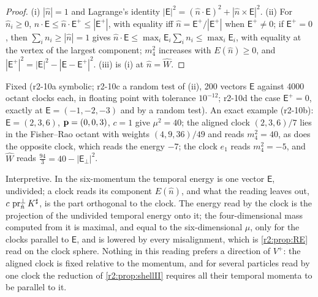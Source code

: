 \begin{proof}
(i) $|\hat n|=1$ and Lagrange's identity $|\boldsymbol{\mathsf E}|^2=(\hat n\cdot\boldsymbol{\mathsf E})^2+|\hat n\times\boldsymbol{\mathsf E}|^2$. (ii) For $\hat n_i\ge0$,
$\hat n\cdot\boldsymbol{\mathsf E}\le \hat n\cdot\boldsymbol{\mathsf E}^+\le|\boldsymbol{\mathsf E}^+|$, with equality iff $\hat n=\boldsymbol{\mathsf E}^+/|\boldsymbol{\mathsf E}^+|$
when $\boldsymbol{\mathsf E}^+\neq0$; if $\boldsymbol{\mathsf E}^+=0$, then $\sum_in_i\ge|\hat n|=1$ gives $\hat n\cdot\boldsymbol{\mathsf E}\le\max_i\mathsf E_i\sum_in_i\le\max_i\mathsf E_i$,
with equality at the vertex of the largest component; $m_4^2$ increases with $E(\hat n)\ge0$, and $|\boldsymbol{\mathsf E}^+|^2=|\boldsymbol{\mathsf E}|^2-|\boldsymbol{\mathsf E}-\boldsymbol{\mathsf E}^+|^2$. (iii) is (i) at $\hat n=\widehat W$.
\end{proof}

Fixed (r2-10a symbolic; r2-10c a random test of (ii), 200 vectors $\boldsymbol{\mathsf E}$ against 4000 octant clocks each, in floating point with tolerance
$10^{-12}$; r2-10d the case $\boldsymbol{\mathsf E}^+=0$, exactly at $\boldsymbol{\mathsf E}=(-1,-2,-3)$ and by a random test). An exact example (r2-10b): $\boldsymbol{\mathsf E}=(2,3,6)$, $\mathbf p=(0,0,3)$, $c=1$ give $\mu^2=40$; the aligned clock $(2,3,6)/7$ lies in the
Fisher--Rao octant with weights $(4,9,36)/49$ and reads $m_4^2=40$, as does the opposite clock, which reads the energy $-7$; the clock $e_1$ reads $m_4^2=-5$, and $\widehat W$ reads $\tfrac{94}3=40-|\boldsymbol{\mathsf E}_\perp|^2$.

\begin{remark}
\label{r2:rem:projection}
Interpretive. In the six-momentum the temporal energy is one vector $\boldsymbol{\mathsf E}$, undivided; a clock reads its component $E(\hat n)$, and what the
reading leaves out, $c\,\operatorname{pr}^{\perp}_{\hat n}K^\sharp$, is the part orthogonal to the clock. The energy read by the clock is the projection of the undivided
temporal energy onto it; the four-dimensional mass computed from it is maximal, and equal to the six-dimensional $\mu$, only for the clocks parallel
to $\boldsymbol{\mathsf E}$, and is lowered by every misalignment, which is \cref{r2:prop:RE} read on the clock sphere. Nothing in this reading prefers a direction of $V^+$: the aligned clock is fixed relative to the momentum,
and for several particles read by one clock the reduction of \cref{r2:prop:shellII} requires all their temporal momenta to be parallel to it.
\end{remark}

